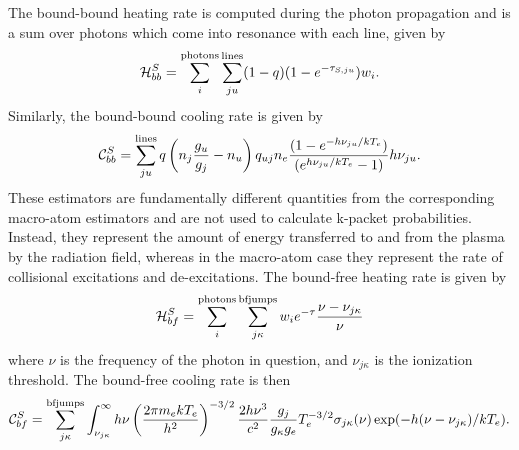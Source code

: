 The bound-bound heating rate is computed during the photon propagation and is a sum
over photons which come into resonance with each line, given by 
\begin{equation}
{\cal H}_{bb}^S = \sum_i^{\mathrm{photons}} \sum^{\mathrm{lines}}_{ju} (1 - q) (1 - e^{-\tau_{S,ju}}) w_i.
\end{equation}
Similarly, the bound-bound cooling rate is given by 
\begin{equation}
{\cal C}_{bb}^S = \sum_{ju}^{\mathrm{lines}} q \left(n_j\frac{g_u}{g_j} - n_u\right) q_{uj} n_e 
\frac{(1 - e^{-h\nu_{ju}/kT_e})}{(e^{h\nu_{ju}/kT_e} - 1)}  h \nu_{ju}.
\end{equation}
These estimators are fundamentally different quantities from the corresponding
macro-atom estimators and are not used to
calculate k-packet probabilities. Instead, they represent the amount of
energy transferred to and from the plasma by the radiation field,
whereas in the macro-atom case they represent the rate of collisional excitations
and de-excitations.
\noindent
The bound-free heating rate is given by
\begin{equation}
{\cal H}_{bf}^S = \sum_i^{\mathrm{photons}} \sum_{j\kappa}^{\mathrm{bfjumps}} w_{i} e^{-\tau} \frac{\nu - \nu_{j\kappa}}{\nu}
\end{equation}
where $\nu$ is the frequency of the photon in question, and $\nu_{j\kappa}$
is the ionization threshold. The bound-free cooling rate is then
\begin{equation}
{\cal C}_{bf}^S = \sum_{j\kappa}^{\mathrm{bfjumps}} \int_{\nu_{j \kappa}}^\infty
h \nu \left(\frac{2 \pi m_e k T_e}{h^2} \right)^{-3/2}
\frac{2 h \nu^3}{c^2} 
\frac{g_j}{g_\kappa g_e}
T_e^{-3/2} \sigma_{j \kappa} (\nu) 
\exp(- h (\nu - \nu_{j \kappa}) / kT_e).
\end{equation}

